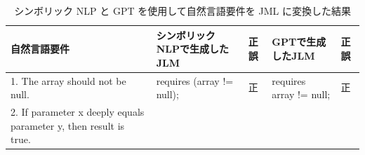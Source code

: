 \documentclass[uplatex, twocolumn,10pt]{jsarticle} %
\begin{document}
\begin{table}[t]
    \caption{シンボリック NLP と GPT を使用して自然言語要件を JML に変換した結果}
    \label{tab:result_1}
    \centering
    \fontsize{6}{5}\selectfont
    \begin{tabular}{p{25mm}|p{45mm}|p{7mm}|p{45mm}|p{7mm}}
        \hline
        自然言語要件                                                                                       & シンボリックNLPで生成したJLM                                                                                                                                                                                    & 正誤                                                                  & GPTで生成したJLM                                                                                                                       & 正誤  \\
        \hline\hline
        1. The array should not be null.                                                                   & requires (array != null);                                                                                                                                                                                       & 正                                                                    & requires array != null;                                                                                                                & 正    \\ \hline
        2. If parameter x deeply equals parameter y, then result is true.


\end{tabular}
\end{table}
\end{document}
